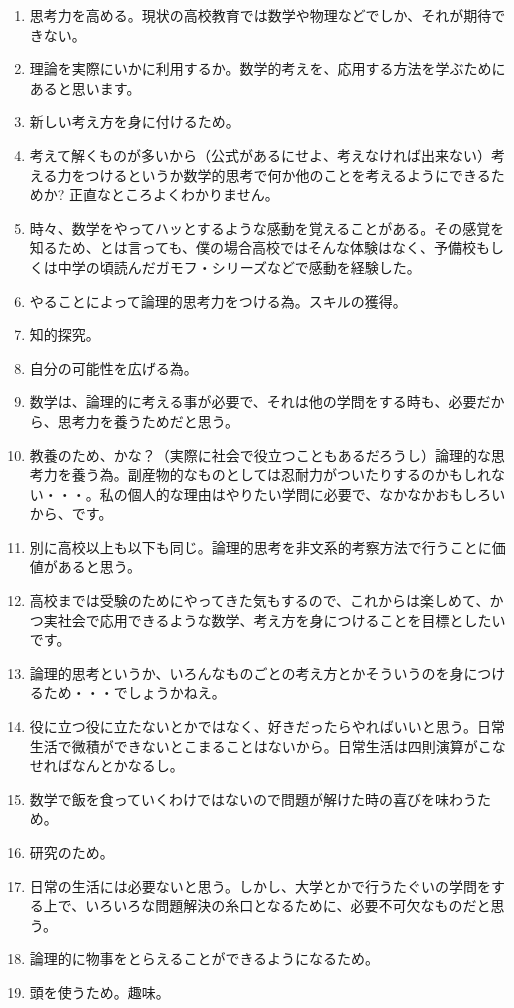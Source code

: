 \documentclass[twocolumn]{jarticle}
\begin{document}
\begin{enumerate}
\item 思考力を高める。現状の高校教育では数学や物理などでしか、それが期待できない。
\item 理論を実際にいかに利用するか。数学的考えを、応用する方法を学ぶためにあると思います。
\item 新しい考え方を身に付けるため。
\item 考えて解くものが多いから（公式があるにせよ、考えなければ出来ない）考える力をつけるというか数学的思考で何か他のことを考えるようにできるためか? 正直なところよくわかりません。
\item 時々、数学をやってハッとするような感動を覚えることがある。その感覚を知るため、とは言っても、僕の場合高校ではそんな体験はなく、予備校もしくは中学の頃読んだガモフ・シリーズなどで感動を経験した。
\item やることによって論理的思考力をつける為。スキルの獲得。
\item 知的探究。
\item 自分の可能性を広げる為。
\item 数学は、論理的に考える事が必要で、それは他の学問をする時も、必要だから、思考力を養うためだと思う。
\item 教養のため、かな？（実際に社会で役立つこともあるだろうし）論理的な思考力を養う為。副産物的なものとしては忍耐力がついたりするのかもしれない・・・。私の個人的な理由はやりたい学問に必要で、なかなかおもしろいから、です。
\item 別に高校以上も以下も同じ。論理的思考を非文系的考察方法で行うことに価値があると思う。
\item 高校までは受験のためにやってきた気もするので、これからは楽しめて、かつ実社会で応用できるような数学、考え方を身につけることを目標としたいです。
\item 論理的思考というか、いろんなものごとの考え方とかそういうのを身につけるため・・・でしょうかねえ。
\item 役に立つ役に立たないとかではなく、好きだったらやればいいと思う。日常生活で微積ができないとこまることはないから。日常生活は四則演算がこなせればなんとかなるし。
\item 数学で飯を食っていくわけではないので問題が解けた時の喜びを味わうため。
\item 研究のため。
\item 日常の生活には必要ないと思う。しかし、大学とかで行うたぐいの学問をする上で、いろいろな問題解決の糸口となるために、必要不可欠なものだと思う。
\item 論理的に物事をとらえることができるようになるため。
\item 頭を使うため。趣味。

\end{enumerate}
\end{document}
